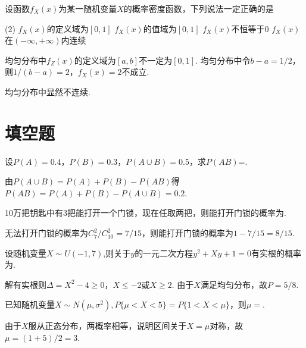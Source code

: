 \begin{problem}
    设函数$f_X(x)$为某一随机变量$X$的概率密度函数，下列说法一定正确的是
    \begin{tasks}(2)
        \task $f_X(x)$的定义域为$[0,1]$
        \task[\true] $f_X(x)$的值域为$[0,1]$
        \task $f_X(x)$不恒等于$0$
        \task $f_X(x)$在$(-\infty,+\infty)$内连续
    \end{tasks}
\end{problem}
\begin{solution}\leavevmode
    \begin{tasks}
        \task 均匀分布中$f_Z(x)$的定义域为$[a,b]$不一定为$[0,1]$.
        \task 均匀分布中令$b-a=1/2$，则$1/(b-a)=2$，$f_X(x)=2$不成立.\addtocounter{task}{1}
        \task 均匀分布中显然不连续.
    \end{tasks}
\end{solution}

\section{填空题}

\begin{problem}
    设$P(A)=0.4$，$P(B)=0.3$，$P(A\cup B)=0.5$，求$P(AB)$=.
\end{problem}
\begin{solution}
    由$P(A\cup B)=P(A)+P(B)-P(AB)$得$P(AB)=P(A)+P(B)-P(A\cup B)=0.2$.
\end{solution}

\begin{problem}
    10万把钥匙中有3把能打开一个门锁，现在任取两把，则能打开门锁的概率为.
\end{problem}
\begin{solution}
    无法打开门锁的概率为$C_7^2/C_{10}^2=7/15$，则能打开门锁的概率为$1-7/15=8/15$.
\end{solution}

\begin{problem}
    设随机变量$X\sim U(-1,7)$,则关于$y$的一元二次方程$y^2+Xy+1=0$有实根的概率为.
\end{problem}
\begin{solution}
    解有实根则$\Delta=X^2-4\geq0$，$X\leq-2$或$X\geq2$. 由于$X$满足均匀分布，故$P=5/8$.
\end{solution}

\begin{problem}
    已知随机变量$X\sim N(\mu,\sigma^2),P\{\mu<X<5\}=P\{1<X<\mu\}$，则$\mu=$.
\end{problem}
\begin{solution}
    由于$X$服从正态分布，两概率相等，说明区间关于$X=\mu$对称，故$\mu=(1+5)/2=3$.
\end{solution}

